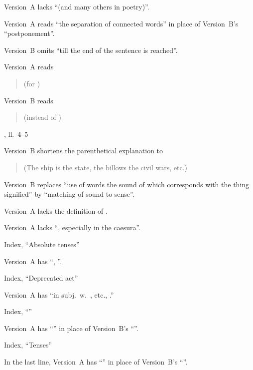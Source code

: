 \begin{variations}
Version~A lacks “(and many others in poetry)”.

\item[{\xref[III]{625}}]

Version~A reads “the separation of connected words” in place of
Version~B's “postponement”.

\item[{\xref[11]{623}}]

Version~B omits “till the end of the sentence is reached”.

\item[{\xref[12]{623}}]

Version~A reads
\begin{quote}
 (for ) 
\end{quote}

Version~B reads
\begin{quote}
 (instead of
)
\end{quote}

\item[{\xref[14]{623}, ll.~4–5}]

Version~B shortens the parenthetical explanation to
\begin{quote}
(The ship is the state, the billows the civil wars, etc.)
\end{quote}

\item[{\xref[20]{623}}]

Version~B replaces “use of words the sound of which corresponds with
the thing signified” by “matching of sound to sense”.

\item[{\xref[21]{623}}]

Version~A lacks the definition of .

\item[{\xref[2]{652}}]

Version~A lacks “, especially in the caesura”.

\item[Index, “Absolute tenses”]

Version~A has “, ”.

\item[Index, “Deprecated act”]

Version~A has “in subj.\ w.\ , etc., .”

\item[Index, “\latin{dīcō}”]

Version~A has “” in place of Version~B's
“”.

\item[Index, “Tenses”]

In the last line, Version~A has “” in place of Version~B's
“”.

\end{variations}

\endinput
